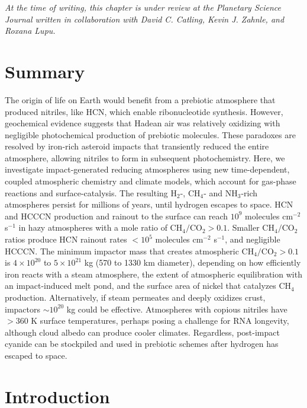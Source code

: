 \noindent \textit{At the time of writing, this chapter is under review at the Planetary Science Journal written in collaboration with David C. Catling, Kevin J. Zahnle, and Roxana Lupu.}

\section*{\centering Summary}

The origin of life on Earth would benefit from a prebiotic atmosphere that produced nitriles, like HCN, which enable ribonucleotide synthesis. However, geochemical evidence suggests that Hadean air was relatively oxidizing with negligible photochemical production of prebiotic molecules. These paradoxes are resolved by iron-rich asteroid impacts that transiently reduced the entire atmosphere, allowing nitriles to form in subsequent photochemistry. Here, we investigate impact-generated reducing atmospheres using new time-dependent, coupled atmospheric chemistry and climate models, which account for gas-phase reactions and surface-catalysis. The resulting H$_2$-, CH$_4$- and NH$_3$-rich atmospheres persist for millions of years, until hydrogen escapes to space. HCN and HCCCN production and rainout to the surface can reach $10^9$ molecules cm$^{-2}$ s$^{-1}$ in hazy atmospheres with a mole ratio of $\mathrm{CH_4} / \mathrm{CO_2} > 0.1$. Smaller $\mathrm{CH_4} / \mathrm{CO_2}$ ratios produce HCN rainout rates $< 10^5$ molecules cm$^{-2}$ s$^{-1}$, and negligible HCCCN. The minimum impactor mass that creates atmospheric $\mathrm{CH_4} / \mathrm{CO_2} > 0.1$ is $4 \times 10^{20}$ to $5 \times 10^{21}$ kg (570 to 1330 km diameter), depending on how efficiently iron reacts with a steam atmosphere, the extent of atmospheric equilibration with an impact-induced melt pond, and the surface area of nickel that catalyzes CH$_4$ production. Alternatively, if steam permeates and deeply oxidizes crust, impactors $\sim 10^{20}$ kg could be effective. Atmospheres with copious nitriles have $> 360$ K surface temperatures, perhaps posing a challenge for RNA longevity, although cloud albedo can produce cooler climates. Regardless, post-impact cyanide can be stockpiled and used in prebiotic schemes after hydrogen has escaped to space.

\section{Introduction}

